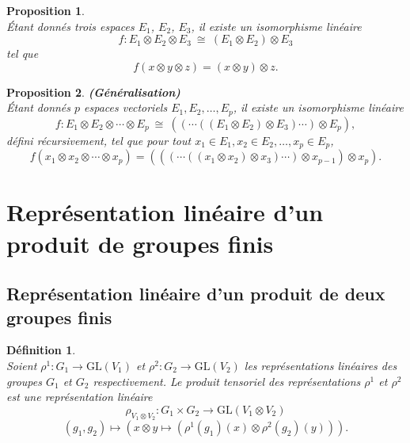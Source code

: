 \documentclass[a4paper, 14pt]{report}
\newtheorem{definition}{Définition}[section]
\newtheorem{proposition}{Proposition}[section]
\begin{document}
\begin{onehalfspace}
{			
			
			\begin{proposition}\cite{greub2012linear}\\
				Étant donnés trois espaces \(E_1\), \(E_2\), \(E_3\), il existe un isomorphisme linéaire  
				\[
				f : E_1 \otimes E_2 \otimes E_3 \ \cong \ (E_1 \otimes E_2) \otimes E_3
				\]
				tel que
				\[
				f(x \otimes y \otimes z) = (x \otimes y) \otimes z.
				\]
			\end{proposition}
			
			
			\begin{proposition}\textbf{(Généralisation)}  \cite{greub2012linear}\\
				Étant donnés \(p\) espaces vectoriels  \(E_1, E_2, \dots, E_p\), il existe un isomorphisme linéaire  
				\[
				f : E_1 \otimes E_2 \otimes \cdots \otimes E_p \ \cong \ ((\cdots((E_1 \otimes E_2) \otimes E_3) \cdots) \otimes E_p),
				\]
				défini récursivement, tel que pour tout \(x_1 \in E_1, x_2 \in E_2, \dots, x_p \in E_p\),
				\[
				f(x_1 \otimes x_2 \otimes \cdots \otimes x_p) = (((\cdots((x_1 \otimes x_2) \otimes x_3) \cdots) \otimes x_{p-1}) \otimes x_p).
				\]
			\end{proposition}
			
			
			
			\section{Représentation linéaire d'un produit de groupes finis}
			\subsection{Représentation linéaire d'un produit de deux groupes finis}
			\begin{definition} \cite{renard2009groupes} \\
				Soient \( \rho^1: G_1 \to \mathrm{GL}(V_1) \) et \( \rho^2: G_2 \to \mathrm{GL}(V_2) \) les représentations linéaires des groupes \( G_1 \) et \( G_2 \) respectivement. Le produit tensoriel des représentations \( \rho^1 \) et \( \rho^2 \) est une représentation linéaire 
				\[
				\rho_{V_1 \otimes V_2} : G_1 \times G_2 \to \mathrm{GL}(V_1 \otimes V_2)
				\]
				\[
				(g_1, g_2) \mapsto (x \otimes y \mapsto (\rho^1(g_1)(x) \otimes \rho^2(g_2)(y))).
				\]
			\end{definition}
			
			
}
\end{onehalfspace}
\end{document}
